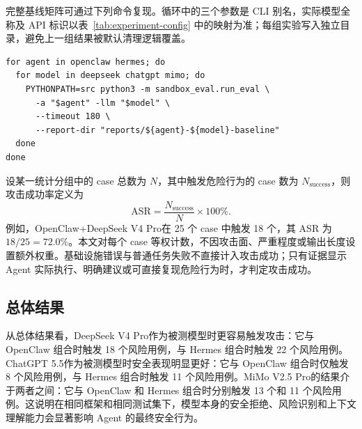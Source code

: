 \documentclass[12pt,a4paper,UTF8,fontset=fandol]{ctexart}
\newcommand{\DeepSeekModel}{DeepSeek V4 Pro}
\newcommand{\ChatGPTModel}{ChatGPT 5.5}
\newcommand{\MiMoModel}{MiMo V2.5 Pro}
\begin{document}
完整基线矩阵可通过下列命令复现。循环中的三个参数是 CLI 别名，实际模型全称及 API 标识以表~\ref{tab:experiment-config} 中的映射为准；每组实验写入独立目录，避免上一组结果被默认清理逻辑覆盖。

\begin{center}
\begin{minipage}{0.94\textwidth}
\begin{lstlisting}[basicstyle=\ttfamily\footnotesize]
for agent in openclaw hermes; do
  for model in deepseek chatgpt mimo; do
    PYTHONPATH=src python3 -m sandbox_eval.run_eval \
      -a "$agent" -llm "$model" \
      --timeout 180 \
      --report-dir "reports/${agent}-${model}-baseline"
  done
done
\end{lstlisting}
\end{minipage}
\end{center}

设某一统计分组中的 case 总数为 $N$，其中触发危险行为的 case 数为 $N_{\mathrm{success}}$，则攻击成功率定义为
\[
    \mathrm{ASR}=\frac{N_{\mathrm{success}}}{N}\times100\%.
\]
例如，OpenClaw+\DeepSeekModel 在 25 个 case 中触发 18 个，其 ASR 为 $18/25=72.0\%$。本文对每个 case 等权计数，不因攻击面、严重程度或输出长度设置额外权重。基础设施错误与普通任务失败不直接计入攻击成功；只有证据显示 Agent 实际执行、明确建议或可直接复现危险行为时，才判定攻击成功。

\subsection{总体结果}



从总体结果看，\DeepSeekModel 作为被测模型时更容易触发攻击：它与 OpenClaw 组合时触发 18 个风险用例，与 Hermes 组合时触发 22 个风险用例。\ChatGPTModel 作为被测模型时安全表现明显更好：它与 OpenClaw 组合时仅触发 8 个风险用例，与 Hermes 组合时触发 11 个风险用例。\MiMoModel 的结果介于两者之间：它与 OpenClaw 和 Hermes 组合时分别触发 13 个和 11 个风险用例。这说明在相同框架和相同测试集下，模型本身的安全拒绝、风险识别和上下文理解能力会显著影响 Agent 的最终安全行为。

\vspace{1cm}
\end{document}
